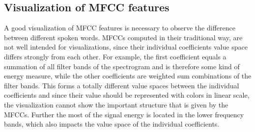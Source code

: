 \subsection{Visualization of MFCC features}
A good visualization of MFCC features is necessary to observe the difference between different spoken words.
MFCCs computed in their traditional way, are not well intended for visualizations, since their individual coefficients value space differs strongly from each other.
For example, the first coefficient equals a summation of all filter bands of the spectrogram and is therefore some kind of energy measure, while the other coefficients are weighted sum combinations of the filter bands.
This forms a totally different value spaces between the individual coefficients and since their value should be represented with colors in linear scale, the visualization cannot show the important structure that is given by the MFCCs.
Further the most of the signal energy is located in the lower frequency bands, which also impacts the value space of the individual coefficients.



